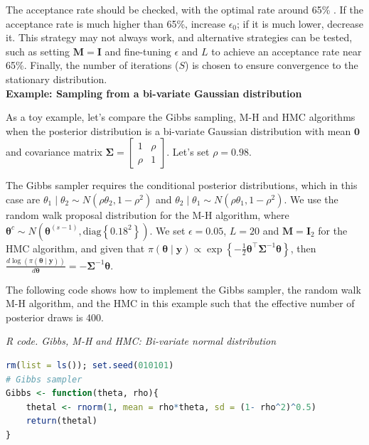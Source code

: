 The acceptance rate should be checked, with the optimal rate around 65\% \cite[Chap.~12]{gelman2021bayesian}. If the acceptance rate is much higher than 65\%, increase \(\epsilon_0\); if it is much lower, decrease it. This strategy may not always work, and alternative strategies can be tested, such as setting \(\bm{M} = \bm{I}\) and fine-tuning \(\epsilon\) and \(L\) to achieve an acceptance rate near 65\%. Finally, the number of iterations (\(S\)) is chosen to ensure convergence to the stationary distribution.\\

\textbf{Example: Sampling from a bi-variate Gaussian distribution}

As a toy example, let's compare the Gibbs sampling, M-H and HMC algorithms when the posterior distribution is a bi-variate Gaussian distribution with mean $\bm{0}$ and covariance matrix $\bm{\Sigma}=\begin{bmatrix}
	1 & \rho \\
	\rho & 1
\end{bmatrix}$. Let's set $\rho= 0.98$.

The Gibbs sampler requires the conditional posterior distributions, which in this case are $\theta_1\mid \theta_2\sim N(\rho\theta_2,1-\rho^2)$ and $\theta_2\mid \theta_1\sim N(\rho\theta_1,1-\rho^2)$. We use the random walk proposal distribution for the M-H algorithm, where $\bm{\theta}^c\sim N(\bm{\theta}^{(s-1)}, \text{diag}\left\{0.18^2\right\})$. We set $\epsilon=0.05$, $L=20$ and $\bm{M}=\bm{I}_2$ for the HMC algorithm, and given that $\pi(\bm{\theta}\mid \bm{y})\propto \exp\left\{-\frac{1}{2}\bm{\theta}^{\top}\bm{\Sigma}^{-1}\bm{\theta}\right\}$, then $\frac{d\log(\pi(\bm{\theta}\mid \bm{y}))}{d\bm{\theta}}=-\bm{\Sigma}^{-1}\bm{\theta}$.

The following code shows how to implement the Gibbs sampler, the random walk M-H algorithm, and the HMC in this example such that the effective number of posterior draws is 400.

\begin{tcolorbox}[enhanced,width=4.67in,center upper,
	fontupper=\large\bfseries,drop shadow southwest,sharp corners]
	\textit{R code. Gibbs, M-H and HMC: Bi-variate normal distribution}
	\begin{VF}
		\begin{lstlisting}[language=R]
rm(list = ls()); set.seed(010101)
# Gibbs sampler
Gibbs <- function(theta, rho){
	thetal <- rnorm(1, mean = rho*theta, sd = (1- rho^2)^0.5)
	return(thetal)
}
\end{lstlisting}
	\end{VF}
\end{tcolorbox} 

